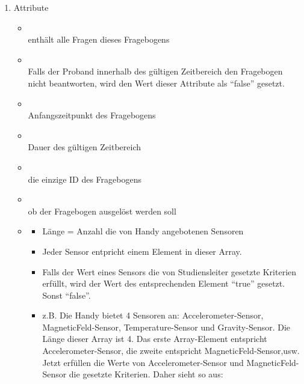 \documentclass[a4paper]{scrreprt}
\begin{document}
{                    \begin{enumerate}
                        \item Attribute
                            \begin{itemize}
                                \item {\large {}}\\
                                    enthält alle Fragen dieses Fragebogens
                                \item {\large {}}\\
                                    Falls der Proband innerhalb des gültigen Zeitbereich den Fragebogen nicht beantworten, wird den Wert dieser Attribute als ``false'' gesetzt.
                                \item {\large {}}\\
                                    Anfangszeitpunkt des Fragebogens
                                \item {\large {}}\\
                                    Dauer des gültigen Zeitbereich
                                \item {\large {}}\\
                                    die einzige ID des Fragebogens
                                \item {\large {}}\\
                                    ob der Fragebogen ausgelöst werden soll
                                \item {\large {}}
                                    \begin{itemize}
                                        \item Länge = Anzahl die von Handy angebotenen Sensoren
                                        \item Jeder Sensor entpricht einem Element in dieser Array.
                                        \item Falls der Wert eines Sensors die von Studiensleiter gesetzte Kriterien erfüllt, wird der Wert des entsprechenden Element ``true'' gesetzt. Sonst ``false''.
                                        \item z.B. Die Handy bietet 4 Sensoren an: Accelerometer-Sensor, MagneticFeld-Sensor, Temperature-Sensor und Gravity-Sensor. Die Länge dieser Array ist 4. Das erste Array-Element entspricht Accelerometer-Sensor, die zweite entspricht MagneticFeld-Sensor,usw. Jetzt erfüllen die Werte von Accelerometer-Sensor und MagneticFeld-Sensor die gesetzte Kriterien. Daher sieht  so aus: \\



\end{itemize}
\end{itemize}
\end{enumerate}}
\end{document}
